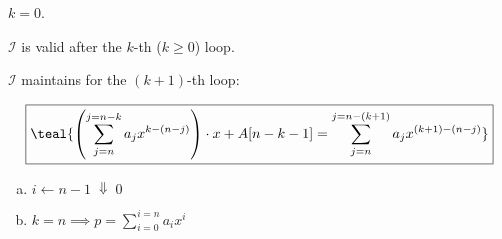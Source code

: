 \begin{frame}{}
  \centerline{}

  \pause
  \vspace{0.30cm}
  \begin{description}[<+->]
    \setlength{\itemsep}{6pt}
    \item[Base Step:] $k = 0$.
    \item[Inductive Hypothesis:] $\mathcal{I}$ is valid after the $k$-th ($k \ge 0$) loop.
    \item[Inductive Step:] $\mathcal{I}$ maintains for the $(k+1)$-th loop:
  \end{description}

  \pause
  \vspace{-0.50cm}
  \[
	\boxed{\teal{\left(\sum_{j = n}^{j = n-k} a_j x^{k-(n-j)}\right) \cdot x + A[n-k-1] = \sum_{j = n}^{j = n-(k+1)} a_j x^{(k+1)-(n-j)}}}
  \]

  \pause
  \vspace{0.30cm}
  \centerline{}
  \pause
  \begin{enumerate}[(a)]
    \centering
    \item $i \gets n-1 \;\Downarrow\; 0$
    \item $k = n \implies p = \sum\limits_{i=0}^{i=n} a_i x^i$
  \end{enumerate}
\end{frame}

